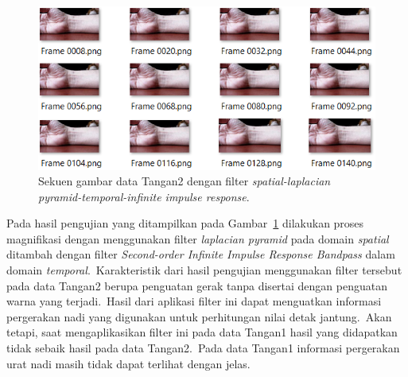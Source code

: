 \begin{figure}[ht]
	\vspace{0.5em}
	\centering
	\includegraphics[width=\textwidth]{data-tangan2}
	\caption{Sekuen gambar data Tangan2 dengan filter \textit{spatial-laplacian pyramid-temporal-infinite impulse response}.}
	\label{fig:sekuen-tangan2}   
\end{figure}
Pada hasil pengujian yang ditampilkan pada Gambar~\ref{fig:sekuen-tangan2} dilakukan proses magnifikasi dengan menggunakan filter \textit{laplacian pyramid} pada domain \textit{spatial} ditambah dengan filter \textit{Second-order Infinite Impulse Response Bandpass} dalam domain \textit{temporal}.~Karakteristik dari hasil pengujian menggunakan filter tersebut pada data Tangan2 berupa penguatan gerak tanpa disertai dengan penguatan warna yang terjadi.~Hasil dari aplikasi filter ini dapat menguatkan informasi pergerakan nadi yang digunakan untuk perhitungan nilai detak jantung.~Akan tetapi, saat mengaplikasikan filter ini pada data Tangan1 hasil yang didapatkan tidak sebaik hasil pada data Tangan2.~Pada data Tangan1 informasi pergerakan urat nadi masih tidak dapat terlihat dengan jelas.

